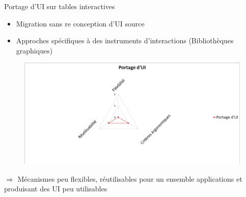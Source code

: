 \documentclass[11pt]{beamer}
\begin{document}
\begin{frame}[t]{Portage d'UI sur tables interactives{\tiny ~\cite{Besacier2010}}}
\begin{itemize}
\item {\scriptsize Migration sans re conception d'UI source}
\item {\scriptsize Approches spécifiques à des instruments d'interactions (Bibliothèques graphiques)}
\end{itemize}
\begin{figure}
\centering
\includegraphics[scale=.3]{./img/synthese2}
\end{figure}
{\scriptsize $\Rightarrow$  Mécanismes peu flexibles, réutilisables pour un ensemble  applications et produisant des UI peu utilisables}\\



\end{frame}
\end{document}
